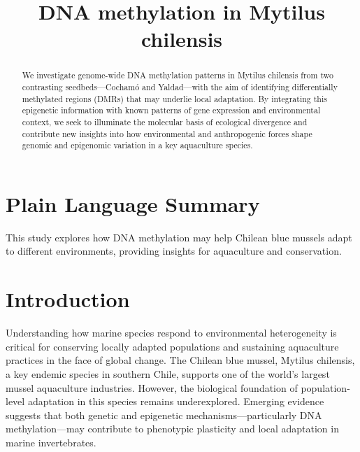 \documentclass[
]{agujournal2019}
\begin{document}
\title{DNA methylation in Mytilus chilensis}



\begin{abstract}
We investigate genome-wide DNA methylation patterns in Mytilus chilensis
from two contrasting seedbeds---Cochamó and Yaldad---with the aim of
identifying differentially methylated regions (DMRs) that may underlie
local adaptation. By integrating this epigenetic information with known
patterns of gene expression and environmental context, we seek to
illuminate the molecular basis of ecological divergence and contribute
new insights into how environmental and anthropogenic forces shape
genomic and epigenomic variation in a key aquaculture species.
\end{abstract}

\section*{Plain Language Summary}
This study explores how DNA methylation may help Chilean blue mussels
adapt to different environments, providing insights for aquaculture and
conservation.




\section{Introduction}\label{introduction}

Understanding how marine species respond to environmental heterogeneity
is critical for conserving locally adapted populations and sustaining
aquaculture practices in the face of global change. The Chilean blue
mussel, Mytilus chilensis, a key endemic species in southern Chile,
supports one of the world's largest mussel aquaculture industries.
However, the biological foundation of population-level adaptation in
this species remains underexplored. Emerging evidence suggests that both
genetic and epigenetic mechanisms---particularly DNA methylation---may
contribute to phenotypic plasticity and local adaptation in marine
invertebrates.
\end{document}
